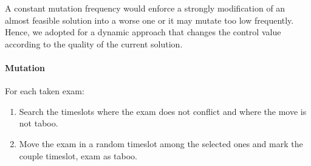 A constant mutation frequency would enforce a strongly modification of an almost feasible solution into a worse one or it may mutate too low frequently. Hence, we adopted for a dynamic approach that changes the control value according to the quality of the current solution.
\paragraph*{Mutation}
For each taken exam:
\begin{enumerate}
\item Search the timeslots where the exam does not conflict and where the move is not taboo.
\item Move the exam in a random timeslot among the selected ones and mark the couple timeslot, exam as taboo.
\end{enumerate}